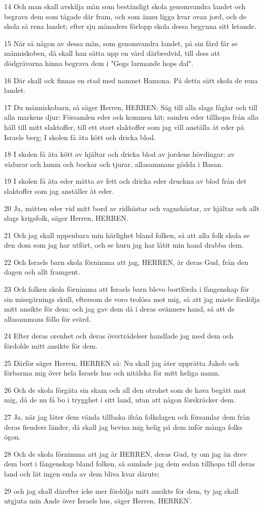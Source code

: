 \par 14 Och man skall avskilja män som beständigt skola genomvandra landet och begrava dem som tågade där fram, och som ännu ligga kvar ovan jord, och de skola så rena landet; efter sju månaders förlopp skola dessa begynna sitt letande.
\par 15 När så någon av dessa män, som genomvandra landet, på sin färd får se människoben, då skall han sätta upp en vård därbredvid, till dess att dödgrävarna hinna begrava dem i "Gogs larmande hops dal".
\par 16 Där skall ock finnas en stad med namnet Hamona. På detta sätt skola de rena landet.
\par 17 Du människobarn, så säger Herren, HERREN: Säg till alla slags fåglar och till alla markens djur: Församlen eder och kommen hit; samlen eder tillhopa från alla håll till mitt slaktoffer, till ett stort slaktoffer som jag vill anställa åt eder på Israels berg; I skolen få äta kött och dricka blod.
\par 18 I skolen få äta kött av hjältar och dricka blod av jordens hövdingar: av vädurar och lamm och bockar och tjurar, allasammans gödda i Basan.
\par 19 I skolen få äta eder mätta av fett och dricka eder druckna av blod från det slaktoffer som jag anställer åt eder.
\par 20 Ja, mätten eder vid mitt bord av ridhästar och vagnshästar, av hjältar och allt slags krigsfolk, säger Herren, HERREN.
\par 21 Och jag skall uppenbara min härlighet bland folken, så att alla folk skola se den dom som jag har utfört, och se huru jag har låtit min hand drabba dem.
\par 22 Och Israels barn skola förnimma att jag, HERREN, är deras Gud, från den dagen och allt framgent.
\par 23 Och folken skola förnimma att Israels barn blevo bortförda i fångenskap för sin missgärnings skull, eftersom de voro trolösa mot mig, så att jag måste fördölja mitt ansikte för dem; och jag gav dem då i deras ovänners hand, så att de allasammans föllo för svärd.
\par 24 Efter deras orenhet och deras överträdelser handlade jag med dem och fördolde mitt ansikte för dem.
\par 25 Därför säger Herren, HERREN så: Nu skall jag åter upprätta Jakob och förbarma mig över hela Israels hus och nitälska för mitt heliga namn.
\par 26 Och de skola förgäta sin skam och all den otrohet som de hava begått mot mig, då de nu få bo i trygghet i sitt land, utan att någon förskräcker dem.
\par 27 Ja, när jag låter dem vända tillbaka ifrån folkslagen och församlar dem från deras fienders länder, då skall jag bevisa mig helig på dem inför många folks ögon.
\par 28 Och de skola förnimma att jag är HERREN, deras Gud, ty om jag än drev dem bort i fångenskap bland folken, så samlade jag dem sedan tillhopa till deras land och lät ingen enda av dem bliva kvar därute;
\par 29 och jag skall därefter icke mer fördölja mitt ansikte för dem, ty jag skall utgjuta min Ande över Israels hus, säger Herren, HERREN'.

